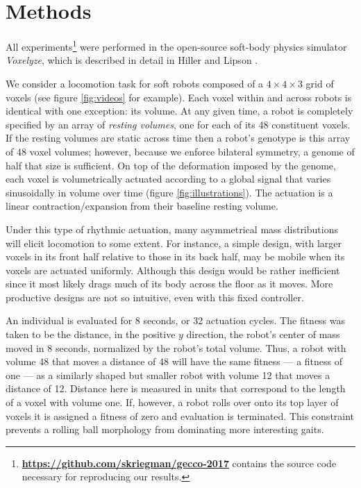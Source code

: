 \section{Methods}
\label{sec3:methods}


All experiments\footnote{\href{https://github.com/skriegman/gecco-2017}{\color{blue}\textbf{https://github.com/skriegman/gecco-2017}} contains the source code necessary for reproducing our results.} were performed in the open-source soft-body physics simulator  
\textit{Voxelyze}, which is described in detail in Hiller and Lipson \cite{hiller2014dynamic}.

We consider a locomotion task for soft robots composed of a $4\times4\times3$ grid of voxels (see figure \ref{fig:videos} for example). 
Each voxel within and across robots is identical with one exception:
its volume.
At any given time, a robot is completely specified by an array of \textit{resting volumes}, one for each of its 48 constituent voxels.
If the resting volumes are static across time then a robot's genotype is this array of 48 voxel volumes; however, because we enforce bilateral symmetry, a genome of half that size is sufficient.
On top of the deformation imposed by the genome, each voxel is volumetrically actuated according to a global signal that varies sinusoidally in volume over time (figure \ref{fig:illustrations}). The actuation is a linear contraction/expansion from their baseline resting volume.

Under this type of rhythmic actuation, many asymmetrical mass distributions will elicit locomotion to some extent. For instance, a simple design, with larger voxels in its front half relative to those in its back half, may be mobile when its voxels are actuated uniformly. Although this design would be rather inefficient since it most likely drags much of its body across the floor as it moves. More productive designs are not so intuitive, even with this fixed controller.

An individual is evaluated for 8 seconds, or 32 actuation cycles.
The fitness was taken to be the distance, in the positive $y$ direction, the robot's center of mass moved in 8 seconds, normalized by the robot's total volume.
Thus, a robot with volume 48 that moves a distance of 48 will have the same fitness --- a fitness of one --- as a similarly shaped but smaller robot with volume 12 that moves a distance of 12. 
Distance here is measured in units that correspond to the length of a voxel with volume one.
If, however, a robot rolls over onto its top layer of voxels it is assigned a fitness of zero and evaluation is terminated. This constraint prevents a rolling ball morphology from dominating more interesting gaits.

